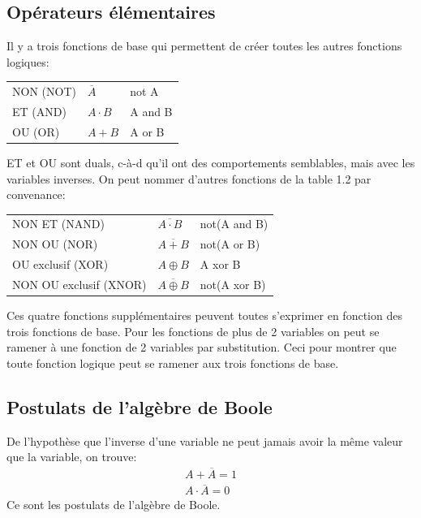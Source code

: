 \subsection{Opérateurs élémentaires}

Il y a trois fonctions de base qui permettent de créer toutes les autres fonctions logiques:
\begin{center}
\begin{tabular}{p{5cm} >{\centering}p{2cm} p{3cm}} 
NON (NOT) &$\overline{A}$ &not A\\
ET (AND) &$A\cdot B$ &A and B\\
OU (OR) &$A+B$ &A or B\\
\end{tabular}
\end{center}
ET et OU sont duals, c-à-d qu'il ont des comportements semblables, mais avec les variables inverses. On peut nommer d'autres fonctions de la table 1.2 par convenance:

\begin{center}
\begin{tabular}{p{5cm} >{\centering}p{2cm} p{3cm}} 
NON ET (NAND) &$\overline{A \cdot B}$ &not(A and B)\\
NON OU (NOR) &$\overline{A+B}$ &not(A or B)\\
OU exclusif (XOR) &$A \oplus B$ &A xor B\\
NON OU exclusif (XNOR) &$\overline{A \oplus B}$ &not(A xor B)\\
\end{tabular}
\end{center}

Ces quatre fonctions supplémentaires peuvent toutes s'exprimer en fonction des trois fonctions de base. Pour les fonctions de plus de 2 variables on peut se ramener à une fonction de 2 variables par substitution. Ceci pour montrer que toute fonction logique peut se ramener aux trois fonctions de base.

\subsection{Postulats de l'algèbre de Boole}
De l'hypothèse que l'inverse d'une variable ne peut jamais avoir la même valeur que la variable, on trouve:
\begin{equation}
\begin{array}{c}
A + \overline{A} = 1 \\
A \cdot \overline{A} = 0
\end{array}
\end{equation}
Ce sont les postulats de l'algèbre de Boole.

